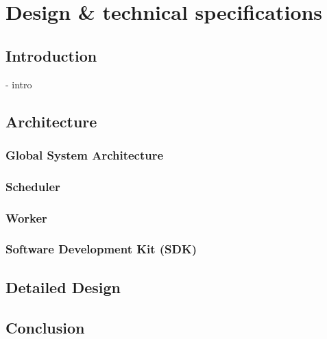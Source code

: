 

\chapter{Design \& technical specifications}

\ifpdf
    \graphicspath{{Chapter3/Figs/Raster/}{Chapter3/Figs/PDF/}{Chapter3/Figs/}}
\else
    \graphicspath{{Chapter3/Figs/Vector/}{Chapter3/Figs/}}
\fi


\section{Introduction}
- intro

\section{Architecture}
    \subsection{Global System Architecture}
    \subsection{Scheduler}
    \subsection{Worker}
    \subsection{Software Development Kit (SDK)}

\section{Detailed Design}

\section{Conclusion}
